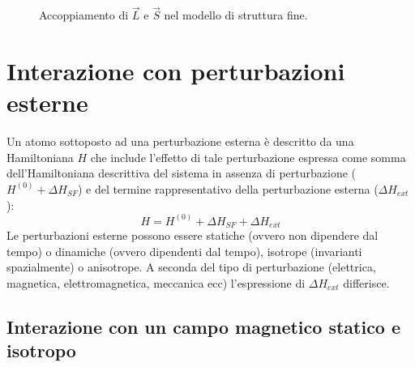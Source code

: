 \begin{exercise}
\begin{solution}
\begin{figure}[ht]
    \centering

    \caption{Accoppiamento di \( \vec{L} \) e \( \vec{S} \) nel modello di struttura fine.}
\end{figure}

\end{solution}

\end{exercise}

\section{Interazione con perturbazioni esterne}
Un atomo sottoposto ad una perturbazione esterna è descritto da una Hamiltoniana \(H\) che include l'effetto di
tale perturbazione espressa come somma dell'Hamiltoniana descrittiva del sistema in assenza di
perturbazione (\(H^{(0)}+ \Delta H_{SF}\)) e del termine rappresentativo della perturbazione esterna (\(\Delta H_{ext}\)):
\begin{equation}
    H = H^{(0)} +\Delta H_{SF} + \Delta H_{ext}
\end{equation}
Le perturbazioni esterne possono essere statiche (ovvero non dipendere dal tempo) o dinamiche (ovvero
dipendenti dal tempo), isotrope (invarianti spazialmente) o anisotrope. A seconda del tipo di perturbazione
(elettrica, magnetica, elettromagnetica, meccanica ecc) l'espressione di \(\Delta H_{ext}\) differisce.

\subsection{Interazione con un campo magnetico statico e isotropo}

